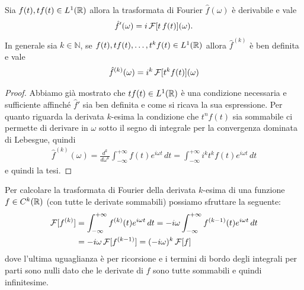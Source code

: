 \begin{theorem} \label{thm: derivata della trasformata di Fourier}
  Sia $ f(t), t f(t) \in L^1(\mathbb{R}) $ allora la trasformata di Fourier $ \hat{f}(\omega) $ è derivabile e vale
  \begin{align}
    \hat{f}'(\omega) = i \operatorname{\mathcal{F}}[t\,f(t)](\omega).
  \end{align}
  In generale sia $ k \in \mathbb{N} $, se $ f(t), tf(t), \dots, t^k f(t) \in L^1(\mathbb{R}) $ allora $ \hat{f}^{(k)} $ è ben definita e vale 
  \begin{align}
    \hat{f}^{(k)}(\omega) = i^k \operatorname{\mathcal{F}}[t^k f(t)](\omega) 
  \end{align}
\end{theorem}
\begin{proof}
  Abbiamo già mostrato che $ t f(t) \in L^1(\mathbb{R}) $ è una condizione necessaria e sufficiente affinché $ \hat{f}' $ sia ben definita e come si ricava la 
  sua espressione. Per quanto riguarda la derivata $ k $-esima la condizione che $ t^n f(t) $ sia sommabile ci permette di derivare in $ \omega $ 
  sotto il segno di integrale per la convergenza dominata di Lebesgue, quindi
  \begin{align}
    \hat{f}^{(k)}(\omega) = \frac{d^{k}}{d\omega^k} \int_{-\infty}^{+\infty} f(t) e^{i\omega t} \, dt 
    = \int_{-\infty}^{+\infty} i^k t^k f(t)e^{i\omega t} \, dt
  \end{align}
  e quindi la tesi.
\end{proof}

Per calcolare la trasformata di Fourier della derivata $ k $-esima di una funzione $ f \in C^k(\mathbb{R}) $ (con tutte le derivate sommabili) 
possiamo sfruttare la seguente:
\begin{align}
  \operatorname{\mathcal{F}}[f^{(k)}] &= \int_{-\infty}^{+\infty} f^{(k)}(t) e^{i\omega t} \, dt = - i \omega \int_{-\infty}^{+\infty} f^{(k-1)}(t)e^{i\omega t} \, dt 
  \\
  &= -i \omega \operatorname{\mathcal{F}}[f^{(k-1)}] = (-i\omega)^k \operatorname{\mathcal{F}}[f]
\end{align}
dove l'ultima uguaglianza è per ricorsione e i termini di bordo degli integrali per parti sono nulli dato che le derivate di $ f $ sono tutte sommabili 
e quindi infinitesime.

